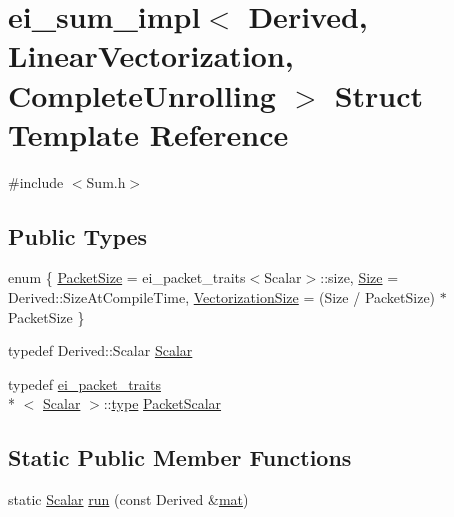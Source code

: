 \hypertarget{structei__sum__impl_3_01_derived_00_01_linear_vectorization_00_01_complete_unrolling_01_4}{\section{ei\-\_\-sum\-\_\-impl$<$ Derived, Linear\-Vectorization, Complete\-Unrolling $>$ Struct Template Reference}
\label{structei__sum__impl_3_01_derived_00_01_linear_vectorization_00_01_complete_unrolling_01_4}
}


{\ttfamily \#include $<$Sum.\-h$>$}

\subsection*{Public Types}
\begin{DoxyCompactItemize}
\item 
enum \{ \hyperlink{structei__sum__impl_3_01_derived_00_01_linear_vectorization_00_01_complete_unrolling_01_4_a562ac99fd327cb5ee83d003fc68a76f9a064dfea61da61f163721d4a6b7d5a610}{Packet\-Size} = ei\-\_\-packet\-\_\-traits$<$Scalar$>$\-:\-:size, 
\hyperlink{structei__sum__impl_3_01_derived_00_01_linear_vectorization_00_01_complete_unrolling_01_4_a562ac99fd327cb5ee83d003fc68a76f9ac06c877a33f8f837b871806f7f5eb8a6}{Size} = Derived\-:\-:Size\-At\-Compile\-Time, 
\hyperlink{structei__sum__impl_3_01_derived_00_01_linear_vectorization_00_01_complete_unrolling_01_4_a562ac99fd327cb5ee83d003fc68a76f9a82b5c6f81bb93f1525b6b737b4d4aa3c}{Vectorization\-Size} = (Size / Packet\-Size) $\ast$ Packet\-Size
 \}
\item 
typedef Derived\-::\-Scalar \hyperlink{structei__sum__impl_3_01_derived_00_01_linear_vectorization_00_01_complete_unrolling_01_4_abf2c64eca928f2db055f1014c528a8c8}{Scalar}
\item 
typedef \hyperlink{structei__packet__traits}{ei\-\_\-packet\-\_\-traits}\\*
$<$ \hyperlink{structei__sum__impl_3_01_derived_00_01_linear_vectorization_00_01_complete_unrolling_01_4_abf2c64eca928f2db055f1014c528a8c8}{Scalar} $>$\-::\hyperlink{glext_8h_a7d05960f4f1c1b11f3177dc963a45d86}{type} \hyperlink{structei__sum__impl_3_01_derived_00_01_linear_vectorization_00_01_complete_unrolling_01_4_a4a7c4604429dbd7cbbb15d05e641eb27}{Packet\-Scalar}
\end{DoxyCompactItemize}
\subsection*{Static Public Member Functions}
\begin{DoxyCompactItemize}
\item 
static \hyperlink{structei__sum__impl_3_01_derived_00_01_linear_vectorization_00_01_complete_unrolling_01_4_abf2c64eca928f2db055f1014c528a8c8}{Scalar} \hyperlink{structei__sum__impl_3_01_derived_00_01_linear_vectorization_00_01_complete_unrolling_01_4_ab5652ded0b41a4688c524562b6e39bbf}{run} (const Derived \&\hyperlink{uavobjecttemplate_8m_a16a51e808b16c46bbfd36da2e37cd123}{mat})
\end{DoxyCompactItemize}


